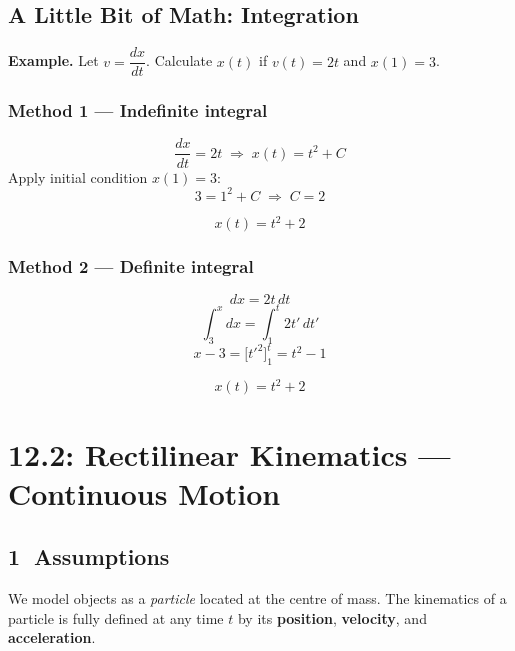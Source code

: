 \documentclass{wilson-summary}
\begin{document}
\subsection*{A Little Bit of Math: Integration}
\textbf{Example.} Let $v = \dfrac{dx}{dt}$. Calculate $x(t)$ if $v(t) = 2t$ and $x(1) = 3$.
 
\medskip
\begin{minipage}[t]{0.48\textwidth}
\subsubsection*{Method 1 — Indefinite integral}
\[
  \frac{dx}{dt} = 2t \;\Rightarrow\; x(t) = t^2 + C
\]
Apply initial condition $x(1)=3$:
\[
  3 = 1^2 + C \;\Rightarrow\; C = 2
\]
\begin{keybox}
\[x(t) = t^2 + 2\]
\end{keybox}
\end{minipage}
\hfill
\begin{minipage}[t]{0.48\textwidth}
\subsubsection*{Method 2 — Definite integral}
\[
  dx = 2t\,dt
\]
\[
  \int_{3}^{x} dx = \int_{1}^{t} 2t'\,dt'
\]
\[
  x - 3 = \bigl[t'^2\bigr]_{1}^{t} = t^2 - 1
\]
\begin{keybox}
\[x(t) = t^2 + 2\]
\end{keybox}
\end{minipage}

\newpage
\section*{12.2: \quad Rectilinear Kinematics — Continuous Motion}
 
\subsection*{\textcircled{\small 1}\; Assumptions}
 
We model objects as a \emph{particle} located at the centre of mass. The kinematics of a particle is fully defined at any time $t$ by its \textbf{position}, \textbf{velocity}, and \textbf{acceleration}.
 
\end{document}

